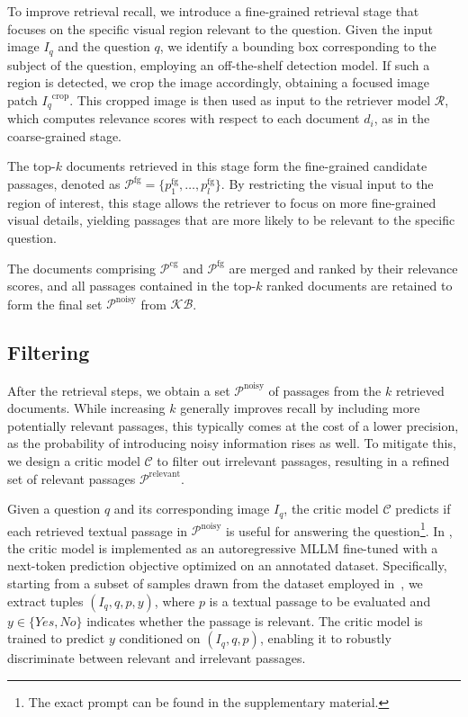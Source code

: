 To improve retrieval recall, we introduce a fine-grained retrieval stage that focuses on the specific visual region relevant to the question.
Given the input image $\mathit{I_q}$ and the question $q$, we identify a bounding box corresponding to the subject of the question, employing an off-the-shelf detection model. If such a region is detected, we crop the image accordingly, obtaining a focused image patch $\mathit{I_q}^{\mathrm{crop}}$.
This cropped image is then used as input to the retriever model $\mathcal{R}$, which computes relevance scores with respect to each document $d_i$, as in the coarse-grained stage. 

The top-$k$ documents retrieved in this stage form the fine-grained candidate passages, denoted as $\mathcal{P}^{\mathrm{fg}} = \{p_1^{\mathrm{fg}}, \dots, p_l^{\mathrm{fg}}\}$.
By restricting the visual input to the region of interest, this stage allows the retriever to focus on more fine-grained visual details, yielding passages that are more likely to be relevant to the specific question.

The documents comprising \(\mathcal{P}^{\mathrm{cg}}\) and \(\mathcal{P}^{\mathrm{fg}}\) are merged and ranked by their relevance scores, and all passages contained in the top-$k$ ranked documents are retained to form the final set \(\mathcal{P}^{\mathrm{noisy}}\) from \(\mathcal{KB}\).

\subsection{Filtering}
After the retrieval steps, we obtain a set $\mathcal{P}^{\mathrm{noisy}}$ of passages from the $k$ retrieved documents. While increasing $k$ generally improves recall by including more potentially relevant passages, this typically comes at the cost of a lower precision, as the probability of introducing noisy information rises as well. To mitigate this, we design a critic model $\mathcal{C}$ to filter out irrelevant passages, resulting in a refined set of relevant passages  $\mathcal{P}^{\mathrm{relevant}}$.

Given a question $q$ and its corresponding image $I_q$, the critic model $\mathcal{C}$ predicts if each retrieved textual passage in $\mathcal{P}^{\mathrm{noisy}}$ is useful for answering the question\footnote{The exact prompt can be found in the supplementary material.}. 
In \ours, the critic model is implemented as an autoregressive MLLM fine-tuned with a next-token prediction objective optimized on an annotated dataset. Specifically, starting from a subset of samples drawn from the dataset employed in~\cite{cocchi2025augmenting}, we extract tuples $(I_{q}, q, p, y)$, where $p$ is a textual passage to be evaluated and $y \in \{\textit{Yes}, \textit{No}\}$ indicates whether the passage is relevant. The critic model is trained to predict $y$ conditioned on $(I_{q}, q, p)$, enabling it to robustly discriminate between relevant and irrelevant passages.

